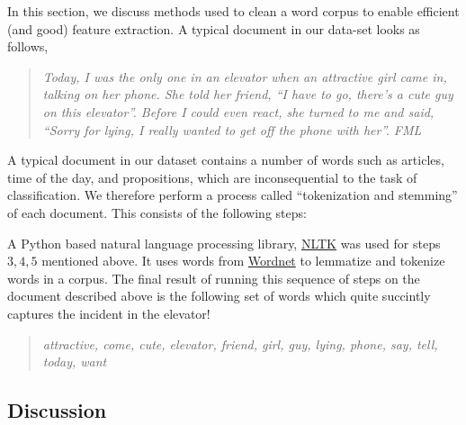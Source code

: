 \documentclass[11pt, letterpaper, conference, final, twocolumn]{ieeeconf}
\begin{document}
In this section, we discuss methods used to clean a word corpus to enable efficient (and good) feature extraction. A typical document in our data-set looks as follows,
\begin{quote}
\emph{Today, I was the only one in an elevator when an attractive girl came in, talking on her phone.  She told her friend, ``I have to go, there's a cute guy on this elevator''.  Before I could even react, she turned to me and said, ``Sorry for lying, I really wanted to get off the phone with her''. FML}
\end{quote}
A typical document in our dataset contains a number of words such as articles, time of the day, and propositions, which are inconsequential to the task of classification. We therefore perform a process called ``tokenization and stemming'' of each document. This consists of the following steps:

A Python based natural language processing library, \href{http://www.nltk.org}{NLTK} was used for steps $3,4,5$ mentioned above. It uses words from \href{http://wordnet.princeton.edu}{Wordnet} to lemmatize and tokenize words in a corpus. The final result of running this sequence of steps on the document described above is the following set of words which quite succintly captures the incident in the elevator!
\begin{quote}
\emph{attractive, come, cute, elevator, friend, girl, guy, lying, phone, say, tell, today, want}
\end{quote}

\subsection{Discussion}
\label{ssec:discussion}
\end{document}
